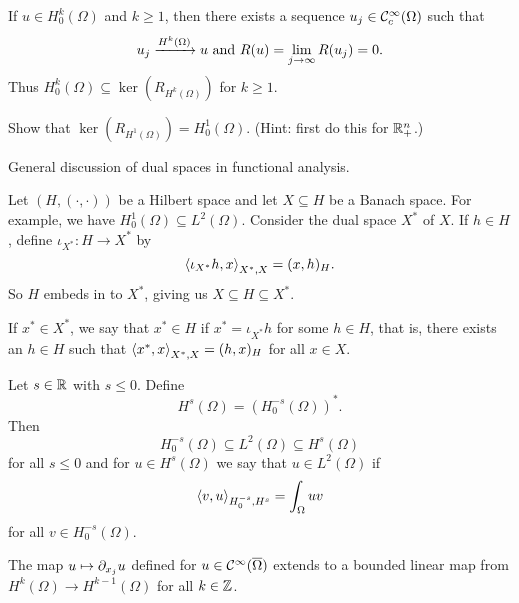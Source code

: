 If $u\in H_0^k(\Omega)$ and $k\geq1$, then there exists a sequence $u_j\in\mathcal{C}_c^\infty(\Omega)$ such that
\[ u_j \xrightarrow{H^k(\Omega)} u \text{ and } R(u) = \lim_{j\to\infty}R(u_j)=0. \]
Thus $H_0^k(\Omega) \subseteq \ker(R_{H^k(\Omega)})$ for $k\geq1$.

\begin{exer}
  Show that $\ker(R_{H^1(\Omega)})=H_0^1(\Omega)$.
  (Hint: first do this for $\mathbb{R}_+^n$.)
\end{exer}

General discussion of dual spaces in functional analysis.

Let $(H,(\cdot,\cdot))$ be a Hilbert space and let $X \subseteq H$ be a Banach space.
For example, we have $H_0^1(\Omega) \subseteq L^2(\Omega)$.
Consider the dual space $X^*$ of $X$.
If $h \in H$, define $\iota_{X^*}: H \to X^*$ by
\[ {\left\langle \iota_{X^*}h,x \right\rangle}_{X^*,X} = (x,h)_H. \]
So $H$ embeds in to $X^*$, giving us $X \subseteq H \subseteq X^*$.

If $x^* \in X^*$, we say that $x^* \in H$ if $x^* = \iota_{X^*} h$ for some $h \in H$, that is, there exists an $h \in H$ such that ${\left\langle x^*,x \right\rangle}_{X^*,X} = (h,x)_H$ for all $x \in X$.

\begin{defn}
  Let $s\in\mathbb{R}$ with $s\leq0$.
  Define
  \[ H^s(\Omega) = \left( H_0^{-s}(\Omega) \right)^*. \]
  Then
  \[ H_0^{-s}(\Omega) \subseteq L^2(\Omega) \subseteq H^s(\Omega) \]
  for all $s\leq0$ and for $u\in H^s(\Omega)$ we say that $u\in L^2(\Omega)$ if
  \[ {\left\langle v,u \right\rangle}_{H_0^{-s},H^s} = \int_\Omega uv \]
  for all $v \in H_0^{-s}(\Omega)$.
\end{defn}

\begin{prop}[Differentiation]
  The map $u \mapsto \partial_{x_j}u$ defined for $u\in\mathcal{C}^\infty(\overline\Omega)$ extends to a bounded linear map from $H^k(\Omega) \to H^{k-1}(\Omega)$ for all $k\in\mathbb{Z}$.
\end{prop}

